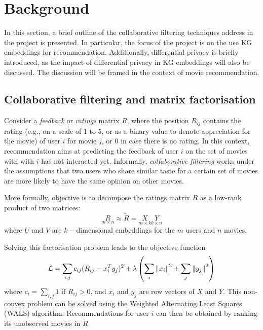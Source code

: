 \section{Background}\label{sec:background}

In this section, a brief outline of the collaborative filtering techniques address in the project is presented.
In particular, the focus of the project is on the use KG embeddings for recommendation.
Additionally, differential privacy \parencite{dwork2008differential} is briefly introduced, as the impact of differential privacy in KG embeddings will also be discussed.
The discussion will be framed in the context of movie recommendation.

\subsection{Collaborative filtering and matrix factorisation}\label{sec:factorisation}

Consider a \emph{feedback} or \emph{ratings} matrix $R$, where the position $R_{ij}$ contains the rating (e.g., on a scale of $1$ to $5$, or as a binary value to denote appreciation for the movie) of user $i$ for movie $j$, or $0$ in case there is no rating.
In this context, recommendation aims at predicting the feedback of user $i$ on the set of movies with with $i$ has not interacted yet. 
Informally, \emph{collaborative filtering} works under the assumptions that two users who share similar taste for a certain set of movies are more likely to have the same opinion on other movies.

More formally, objective is to decompose the ratings matrix $R$ as a low-rank product of two matrices: 
$$ \underset{\scriptscriptstyle{m \times n}}{R} \approx \widetilde{R} = \underset{\scriptscriptstyle{m\times k}}{X}\underset{\scriptscriptstyle{k\times n}}{Y}$$
where $U$ and $V$ are $k-$dimensional embeddings for the $m$ users and $n$ movies.

Solving this factorisation problem leads to the objective function
\begin{equation}\label{eq:wals}
  \mathcal{L} = \sum_{i, j} c_{ij} (R_{ij} - {x_i^T y_j})^2 + \lambda \left( \sum_i \left\lVert{x_i}\right\rVert^2 + \sum_j \left\lVert{y_j}\right\rVert^2 \right)
\end{equation}
where $c_i = \sum_{i, j}1$ if $R_{ij}>0$, and $x_i$ and $y_j$ are row vectors of $X$ and $Y$.
This non-convex problem can be solved using the Weighted Alternating Least Squares (WALS) algorithm.
Recommendations for user $i$ can then be obtained by ranking its unobserved movies in $\widetilde{R}$.

